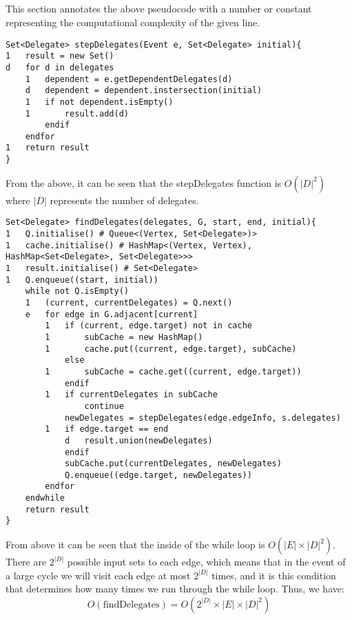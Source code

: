 \documentclass{article}
\begin{document}
\subsection{}
This section annotates the above pseudocode with a number or constant representing the computational complexity of the given line.

\begin{verbatim}
Set<Delegate> stepDelegates(Event e, Set<Delegate> initial){
1   result = new Set()
d   for d in delegates
    1   dependent = e.getDependentDelegates(d)
    d   dependent = dependent.instersection(initial)
    1   if not dependent.isEmpty()
    1       result.add(d)
        endif
    endfor
1   return result
}
\end{verbatim}

From the above, it can be seen that the stepDelegates function is \(O(|D|^2)\) where \(|D|\) represents the number of delegates.

\begin{verbatim}
Set<Delegate> findDelegates(delegates, G, start, end, initial){
1   Q.initialise() # Queue<(Vertex, Set<Delegate>)>
1   cache.initialise() # HashMap<(Vertex, Vertex), HashMap<Set<Delegate>, Set<Delegate>>>
1   result.initialise() # Set<Delegate>
1   Q.enqueue((start, initial))
    while not Q.isEmpty()
    1   (current, currentDelegates) = Q.next()
    e   for edge in G.adjacent[current]
        1   if (current, edge.target) not in cache
        1       subCache = new HashMap()
        1       cache.put((current, edge.target), subCache)
            else
        1       subCache = cache.get((current, edge.target))
            endif
        1   if currentDelegates in subCache
                continue
            newDelegates = stepDelegates(edge.edgeInfo, s.delegates)
        1   if edge.target == end
            d   result.union(newDelegates)
            endif
            subCache.put(currentDelegates, newDelegates)
            Q.enqueue((edge.target, newDelegates))
        endfor
    endwhile
    return result
}
\end{verbatim}

From above it can be seen that the inside of the while loop is \(O(|E|\times|D|^2)\). There are \(2^|D|\) possible input sets to each edge, which means that in the event of a large cycle we will visit each edge at most \(2^{|D|}\) times, and it is this condition that determines how many times we run through the while loop. Thus, we have:
$$O(\text{findDelegates}) = O(2^{|D|}\times |E| \times |D|^2)$$
\end{document}
